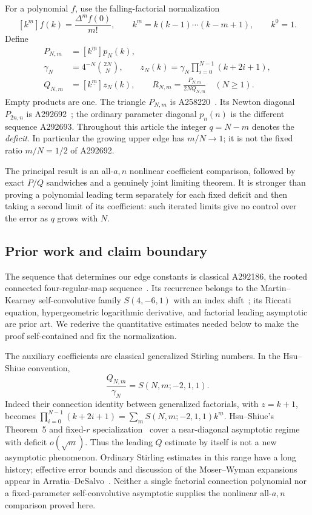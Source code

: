 \documentclass[11pt,letterpaper]{article}
\theoremstyle{remark}\newtheorem{remark}[theorem]{Remark}
\newcommand{\fall}[2]{#1^{\underline{#2}}}
\begin{document}
For a polynomial $f$, use the falling-factorial normalization
\begin{equation}\label{wdn:edge:eq:newton}
 [\fall{k}{m}]f(k)=\frac{\Delta^m f(0)}{m!},\qquad
 \fall{k}{m}=k(k-1)\cdots(k-m+1),\qquad \fall{k}{0}=1.
\end{equation}
Define
\begin{equation}\label{wdn:edge:eq:PQ}
 \begin{split}
 P_{N,m}&=[\fall{k}{m}]p_N(k),\\
 \gamma_N&=4^{-N}\binom{2N}{N},\qquad
 z_N(k)=\gamma_N\prod_{i=0}^{N-1}(k+2i+1),\\
 Q_{N,m}&=[\fall{k}{m}]z_N(k),\qquad
 R_{N,m}=\frac{P_{N,m}}{2NQ_{N,m}}\quad(N\ge1).
 \end{split}
\end{equation}
Empty products are one. The triangle $P_{N,m}$ is A258220~\cite{A258220}.
Its Newton diagonal $P_{2n,n}$ is A292692~\cite{A292692}; the ordinary
parameter diagonal $p_n(n)$ is the different sequence A292693.
Throughout this article the integer $q=N-m$ denotes the \emph{deficit}.
In particular the growing upper edge has $m/N\to1$; it is not the fixed
ratio $m/N=1/2$ of A292692.

The principal result is an all-$a,n$ nonlinear coefficient comparison,
followed by exact $P/Q$ sandwiches and a genuinely joint limiting theorem.
It is stronger than proving a polynomial leading term separately for each
fixed deficit and then taking a second limit of its coefficient: such
iterated limits give no control over the error as $q$ grows with $N$.

\subsection{Prior work and claim boundary}
The sequence that determines our edge constants is classical A292186,
the rooted connected four-regular-map sequence~\cite{A292186,CK}.
Its recurrence belongs to the Martin--Kearney self-convolutive family
$S(4,-6,1)$ with an index shift~\cite{MK}; its Riccati equation,
hypergeometric logarithmic derivative, and factorial leading asymptotic
are prior art. We rederive the quantitative estimates needed below to
make the proof self-contained and fix the normalization.

The auxiliary coefficients are classical generalized Stirling numbers.
In the Hsu--Shiue convention,
\begin{equation}\label{wdn:edge:eq:HS}
 \frac{Q_{N,m}}{\gamma_N}=S(N,m;-2,1,1).
\end{equation}
Indeed their connection identity between generalized factorials, with
$z=k+1$, becomes
$\prod_{i=0}^{N-1}(k+2i+1)=\sum_m S(N,m;-2,1,1)\fall{k}{m}$.
Hsu--Shiue's Theorem~5 and fixed-$r$ specialization~\cite[Section~5.2]{HS}
cover a near-diagonal asymptotic regime with deficit $o(\sqrt m)$.
Thus the leading $Q$ estimate by itself is not a new asymptotic phenomenon.
Ordinary Stirling estimates in this range have a long history; effective
error bounds and discussion of the Moser--Wyman expansions appear in
Arratia--DeSalvo~\cite{AD}. Neither a single factorial connection
polynomial nor a fixed-parameter self-convolutive asymptotic supplies the
nonlinear all-$a,n$ comparison proved here.
\end{document}
